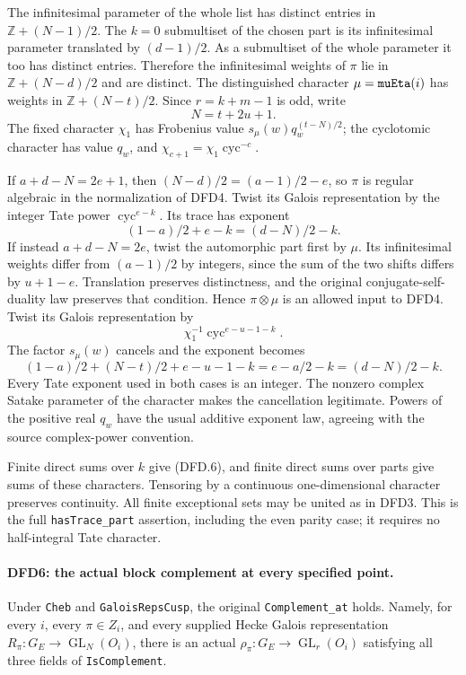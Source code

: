 \documentclass[11pt,a4paper]{article}
\numberwithin{equation}{section}
\theoremstyle{remark}\newtheorem{remark}[theorem]{Remark}
\begin{document}
The infinitesimal parameter of the whole list has distinct
entries in $\mathbb Z+(N-1)/2$. The $k=0$ submultiset of the
chosen part is its infinitesimal parameter translated by
$(d-1)/2$. As a submultiset of the whole parameter it too has
distinct entries. Therefore the infinitesimal weights of
$\pi$ lie in $\mathbb Z+(N-d)/2$ and are distinct. The
distinguished character $\mu=\texttt{mu\allowbreak Eta}(i)$ has weights in
$\mathbb Z+(N-t)/2$. Since $r=k+m-1$ is odd, write
\[
                    N=t+2u+1.                           \tag{DFD.7}
\]
The fixed character $\chi_1$ has Frobenius value
$s_\mu(w)q_w^{(t-N)/2}$; the cyclotomic character has value
$q_w$, and $\chi_{c+1}=\chi_1\operatorname{cyc}^{-c}$.

If $a+d-N=2e+1$, then
$(N-d)/2=(a-1)/2-e$, so $\pi$ is regular algebraic in the
normalization of DFD4. Twist its Galois representation by the
integer Tate power $\operatorname{cyc}^{e-k}$. Its trace has
exponent
\[
                 (1-a)/2+e-k=(d-N)/2-k.
\]
If instead $a+d-N=2e$, twist the automorphic part first by
$\mu$. Its infinitesimal weights differ from $(a-1)/2$ by
integers, since the sum of the two shifts differs by
$u+1-e$. Translation preserves distinctness, and the original
conjugate-self-duality law preserves that condition. Hence
$\pi\otimes\mu$ is an allowed input to DFD4. Twist its
Galois representation by
\[
                \chi_1^{-1}\operatorname{cyc}^{e-u-1-k}.
\]
The factor $s_\mu(w)$ cancels and the exponent becomes
\[
 (1-a)/2+(N-t)/2+e-u-1-k
          =e-a/2-k=(d-N)/2-k.                            \tag{DFD.8}
\]
Every Tate exponent used in both cases is an integer.
The nonzero complex Satake parameter of the character makes
the cancellation legitimate. Powers of the positive real
$q_w$ have the usual additive exponent law, agreeing with the
source complex-power convention.

Finite direct sums over $k$ give (DFD.6), and finite direct
sums over parts give sums of these characters. Tensoring by a
continuous one-dimensional character preserves continuity.
All finite exceptional sets may be united as in DFD3. This is
the full \texttt{has\allowbreak Trace\_\allowbreak part} assertion, including the even
parity case; it requires no half-integral Tate character.

\paragraph{DFD6: the actual block complement at every specified point.}
\label{claim:DFD6}
Under \texttt{Cheb} and \texttt{Galois\allowbreak Reps\allowbreak Cusp}, the original
\texttt{Complement\_\allowbreak at} holds. Namely, for every $i$, every
$\pi\in Z_i$, and every supplied Hecke Galois representation
$R_\pi:G_E\to\operatorname{GL}_N(O_i)$, there is an actual
$\rho_\pi:G_E\to\operatorname{GL}_r(O_i)$ satisfying all
three fields of \texttt{Is\allowbreak Complement}.
\end{document}
